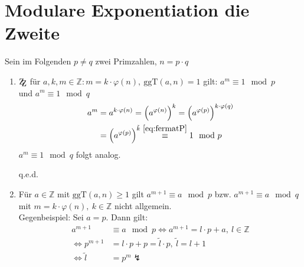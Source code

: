 \documentclass[DIN, pagenumber=false, fontsize=11pt, parskip=half]{scrartcl}
\newcommand{\Z}[0]{\mathbb{Z}}
\newcommand{\ZZ}{\mathrm{Z\kern-.3em\raise-0.5ex\hbox{Z}}}
\newcommand{\ggt}{\text{ggT}}
\newcommand{\congTo}[3][]{\stackrel{#1}{\equiv} #2\mod #3}
\newcommand{\Qed}{\begin{flushright}
    q.e.d.
\end{flushright}}
\begin{document}
    \section{Modulare Exponentiation die Zweite}
    Sein  im Folgenden $p \neq q$ zwei Primzahlen, $n = p \cdot q$
    \begin{enumerate}[label=(\roman*)]
        \item $\ZZ$ für $a, k, m \in \Z :  m = k \cdot \varphi(n), \ \ggt(a, n) = 1$ gilt: $a^m \congTo{1}{p}$ \\ und $a^m \congTo{1}{q}$ \\
              \begin{align}
                  a^m &= a^{k \cdot \varphi(n)} = \left(a^{\varphi(n)}\right)^k = \left(a^{\varphi(p)}\right)^{k \cdot \varphi(q)} \\
                  &= \left(a^{\varphi(p)}\right)^{\tilde{k}} \congTo[\ref{eq:fermatP}]{1}{p}
              \end{align}
              $a^m \congTo{1}{q}$ folgt analog. \Qed
        \item Für $a \in \Z$ mit $\ggt(a, n)\geq 1$ gilt $a^{m + 1} \congTo{a}{p}$ bzw. $a^{m + 1} \congTo{a}{q}$ mit
              $m = k \cdot \varphi(n), \ k \in \Z$ nicht allgemein. \\
              Gegenbeispiel: Sei $a = p$. Dann gilt:
              \begin{align}
                  a^{m + 1} &\congTo{a}{p} \Leftrightarrow a^{m + 1} = l \cdot p + a, \ l \in \Z \\
                  \Leftrightarrow p^{m + 1} &= l \cdot p + p = \tilde{l} \cdot p, \ \tilde{l} = l + 1 \\
                  \Leftrightarrow \tilde{l} &= p^m \lightning
              \end{align}
    \end{enumerate}
\end{document}
